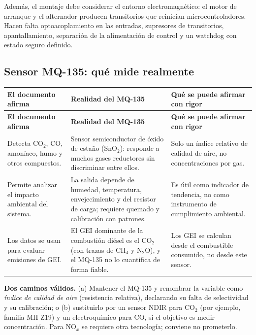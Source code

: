 \documentclass[11pt,a4paper]{article}
\begin{document}
Además, el montaje debe considerar el entorno electromagnético: el motor de arranque y el alternador producen transitorios que reinician microcontroladores. Hacen falta optoacoplamiento en las entradas, supresores de transitorios, apantallamiento, separación de la alimentación de control y un watchdog con estado seguro definido.

\subsection{Sensor MQ-135: qué mide realmente}

\begingroup\small
\begin{longtable}{@{}>{\raggedright\arraybackslash}p{5.2cm} >{\raggedright\arraybackslash}p{4.4cm} >{\raggedright\arraybackslash}p{6.0cm}@{}}
\toprule
\textbf{El documento afirma} & \textbf{Realidad del MQ-135} & \textbf{Qué se puede afirmar con rigor} \\
\midrule
\endfirsthead
\toprule
\textbf{El documento afirma} & \textbf{Realidad del MQ-135} & \textbf{Qué se puede afirmar con rigor} \\
\midrule
\endhead
Detecta CO$_2$, CO, amoníaco, humo y otros compuestos. & Sensor semiconductor de óxido de estaño (SnO$_2$): responde a muchos gases reductores sin discriminar entre ellos. & Solo un índice relativo de calidad de aire, no concentraciones por gas. \\
Permite analizar el impacto ambiental del sistema. & La salida depende de humedad, temperatura, envejecimiento y del resistor de carga; requiere quemado y calibración con patrones. & Es útil como indicador de tendencia, no como instrumento de cumplimiento ambiental. \\
Los datos se usan para evaluar emisiones de GEI. & El GEI dominante de la combustión diésel es el CO$_2$ (con trazas de CH$_4$ y N$_2$O), y el MQ-135 no lo cuantifica de forma fiable. & Los GEI se calculan desde el combustible consumido, no desde este sensor. \\
\bottomrule
\end{longtable}
\endgroup

\begin{tcolorbox}[cajaRecomendacion]
\textbf{Dos caminos válidos.} (a) Mantener el MQ-135 y renombrar la variable como \emph{índice de calidad de aire} (resistencia relativa), declarando su falta de selectividad y su calibración; o (b) sustituirlo por un sensor NDIR para CO$_2$ (por ejemplo, familia MH-Z19) y un electroquímico para CO, si el objetivo es medir concentración. Para NO$_x$ se requiere otra tecnología; conviene no prometerlo.
\end{tcolorbox}
\end{document}
